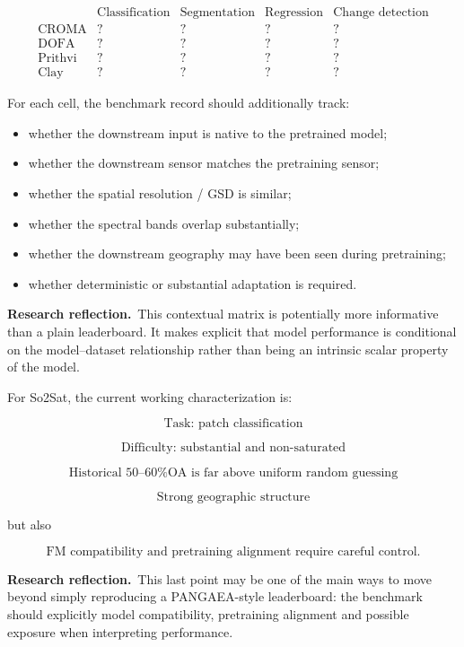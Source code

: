 \documentclass[11pt,a4paper]{article}
\newcommand{\reflection}{\textcolor{reflectionorange}{\textbf{Research reflection.}}}
\begin{document}
\[
\begin{array}{c|cccc}
 & \text{Classification}
 & \text{Segmentation}
 & \text{Regression}
 & \text{Change detection}\\
\hline
\text{CROMA} & ? & ? & ? & ?\\
\text{DOFA} & ? & ? & ? & ?\\
\text{Prithvi} & ? & ? & ? & ?\\
\text{Clay} & ? & ? & ? & ?
\end{array}
\]

For each cell, the benchmark record should additionally track:

\begin{itemize}
    \item whether the downstream input is native to the pretrained model;
    \item whether the downstream sensor matches the pretraining sensor;
    \item whether the spatial resolution / GSD is similar;
    \item whether the spectral bands overlap substantially;
    \item whether the downstream geography may have been seen during pretraining;
    \item whether deterministic or substantial adaptation is required.
\end{itemize}

\reflection\ This contextual matrix is potentially more informative than a plain leaderboard.
It makes explicit that model performance is conditional on the model--dataset relationship
rather than being an intrinsic scalar property of the model.

For So2Sat, the current working characterization is:

\[
\boxed{\text{Task: patch classification}}
\]

\[
\boxed{\text{Difficulty: substantial and non-saturated}}
\]

\[
\boxed{\text{Historical 50--60\% OA is far above uniform random guessing}}
\]

\[
\boxed{\text{Strong geographic structure}}
\]

but also

\[
\boxed{\text{FM compatibility and pretraining alignment require careful control}.}
\]

\reflection\ This last point may be one of the main ways to move beyond simply reproducing
a PANGAEA-style leaderboard: the benchmark should explicitly model compatibility,
pretraining alignment and possible exposure when interpreting performance.
\end{document}
